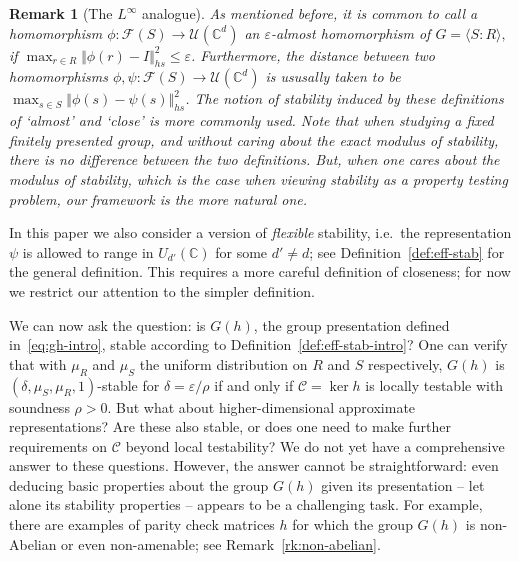 \documentclass[11pt]{article}
\newtheorem{remark}[theorem]{Remark}
\theoremstyle{definition}
\newcommand{\code}{\mathscr{C}}
\newcommand{\Id}{\ensuremath{I}}
\newcommand{\C}{\ensuremath{\mathbb{C}}}
\newcommand{\complex}{\ensuremath{\mathbb{C}}}
\newcommand{\mF}{\ensuremath{\mathcal{F}}}
\newcommand{\mU}{\ensuremath{\mathcal{U}}}
\newcommand{\eps}{\varepsilon}
\begin{document}
\begin{remark}[The $L^\infty$ analogue]\label{rem:L^infty_analogue_defn}
    As mentioned  before, it is common to call a homomorphism $\phi\colon \mF(S)\to \mU(\complex^d)$ an $\eps$-almost homomorphism of $G=\langle S\colon R\rangle,$  if $\max_{r\in R}\Vert \phi(r)-\Id\Vert_{hs}^2\leq \eps$. Furthermore, the distance between two homomorphisms $\phi,\psi\colon \mF(S)\to \mU(\complex^d)$ is ususally taken to be $\max_{s\in S}\Vert \phi(s)-\psi(s)\Vert_{hs}^2$. The notion of stability induced by these definitions of `almost' and `close' is more commonly used. Note that when studying a fixed finitely presented group, and without caring about the exact modulus of stability, there is no difference between the two definitions.  But, when one cares about the modulus of stability, which is the case  when viewing stability as a property testing problem, our framework is the more natural one. 
\end{remark}

In this paper we also consider a version of \emph{flexible} stability, i.e.\ the representation $\psi$ is allowed to range in $U_{d'}(\C)$ for some $d'\neq d$; see Definition~\ref{def:eff-stab} for the general definition. This requires a more careful definition of closeness; for now we restrict our attention to the simpler definition. %

We can now ask the question: is $G(h)$, the group presentation defined in~\eqref{eq:gh-intro}, stable according to Definition~\ref{def:eff-stab-intro}? One can verify that with $\mu_R$ and $\mu_S$ the uniform distribution on $R$ and $S$ respectively, $G(h)$ is $(\delta,\mu_S,\mu_R,1)$-stable for $\delta=\eps/\rho$ if and only if $\code = \ker h$ is locally testable with soundness $\rho>0$. But what about higher-dimensional approximate representations? Are these also stable, or does one need to make further requirements on $\code$ beyond local testability? We do not yet have a comprehensive answer to these questions. However, the answer cannot be straightforward: even deducing basic properties about the group $G(h)$ given its presentation -- let alone its stability properties -- appears to be a challenging task. For example, there are examples of parity check matrices $h$ for which the group $G(h)$ is non-Abelian or even non-amenable; see Remark~\ref{rk:non-abelian}.
\end{document}
